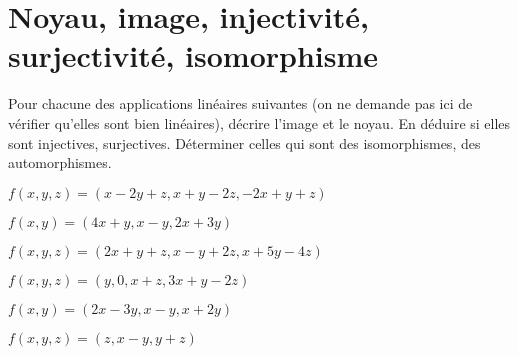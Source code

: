 \documentclass[a4paper, 11pt,reqno]{article}
\begin{document}
% 
\vspace*{0.5cm}

\noindent\section{\large{Noyau, image, injectivit\'e, surjectivit\'e, isomorphisme}}

\begin{exercice}  \;
	Pour chacune des applications lin\'eaires suivantes (on ne demande pas ici de v\'erifier qu'elles sont bien lin\'eaires), d\'ecrire l'image et le noyau. En d\'eduire si elles sont injectives, surjectives. D\'eterminer celles qui sont des isomorphismes, des automorphismes.
	\begin{enumerate}
		\begin{minipage}[t]{0.45\textwidth}
			\item $f(x,y,z)=(x-2y+z,x+y-2z,-2x+y+z)$
			\item  $f(x,y)=(4x+y,x-y,2x+3y)$
			\item $f(x,y,z)=(2x+y+z, x-y+2z, x+5y-4z)$
		\end{minipage}
		\quad
		\begin{minipage}[t]{0.45\textwidth}
			\item $f(x,y,z)=(y,0,x+z,3x+y-2z)$
			\item $f(x,y)=(2x-3y, x-y, x+2y)$
			\item $f(x,y,z)= (z,x-y,y+z)$
		\end{minipage}
	\end{enumerate}
\end{exercice}
\end{document}
